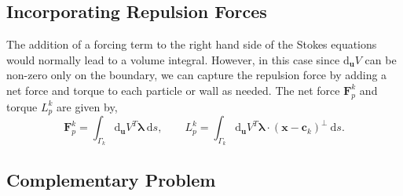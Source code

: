 \documentclass[preprint, 10pt]{elsarticle}
\begin{document}
\subsection{Incorporating Repulsion Forces}

The addition of a forcing term to the right hand side of the Stokes equations would normally lead to a volume integral. However, in this case since $\text{d}_{\mathbf{u}} V$ can be non-zero only on the boundary, we can capture the repulsion force by adding a net force and torque to each particle or wall as needed. The net force $\mathbf{F}^k_p$ and torque $L^k_p$ are given by,
\[ \mathbf{F}^k_p = \int_{\Gamma_k} \text{d}_\mathbf{u}V^T\pmb{\lambda}~\text{d}s, \qquad L_p^k = \int_{\Gamma_k}  \text{d}_\mathbf{u}V^T\pmb{\lambda}\cdot(\mathbf{x}-\mathbf{c}_k)^\perp~\text{d}s.\]

\subsection{Complementary Problem}
\end{document}
